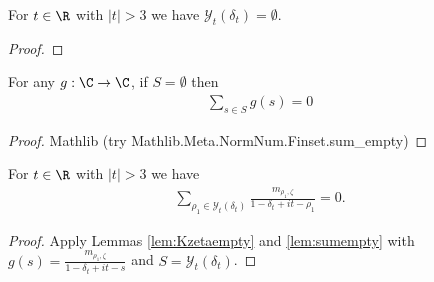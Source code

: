 \begin{lemma}\label{lem:Kzetaempty} 
\leanok
For $t\in\R$ with $|t|>3$ we have $\mathcal{Y}_t(\delta_t)= \emptyset$.
\end{lemma}
\begin{proof}
\leanok
\end{proof}


\begin{lemma} \label{lem:sumempty} 
\leanok
For any $g:\C\to\C$, if $S=\emptyset$ then
\begin{align*}
\sum_{s\in S}g(s) = 0
\end{align*}
\end{lemma}
\begin{proof}
\leanok
Mathlib (try Mathlib.Meta.NormNum.Finset.sum\_empty)
\end{proof}

\begin{lemma}\label{lem:Ksumempty} 
\leanok
For $t\in\R$ with $|t|>3$ we have
\begin{align*}
\sum_{\rho_1\in \mathcal{Y}_t(\delta_t)} \frac{m_{\rho_1,\zeta}}{1-\delta_t+it-\rho_1} = 0.
\end{align*}
\end{lemma}
\begin{proof}
\leanok
Apply Lemmas \ref{lem:Kzetaempty} and \ref{lem:sumempty} with $g(s) = \frac{m_{\rho_1,\zeta}}{1-\delta_t+it-s}$ and $S=\mathcal{Y}_t(\delta_t)$.
\end{proof}

